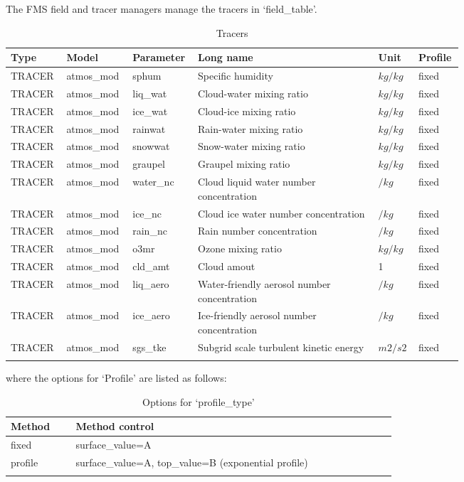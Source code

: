\documentclass[11pt,fleqn]{report}              %
\begin{document}
The FMS field and tracer managers manage the tracers in `field\_table'.
{
\fontsize{9}{11}\selectfont
\begin{longtable}{ p{0.08\linewidth} | p{0.1\linewidth} | p{0.08\linewidth} | p{0.37\linewidth}  | p{0.05\linewidth} | p{0.06\linewidth}}
\hline
\hline
 Type & Model & Parameter & Long name & Unit  & Profile \\
\hline
 TRACER & atmos\_mod & sphum & Specific humidity & $kg/kg$ & fixed \\
 TRACER & atmos\_mod & liq\_wat & Cloud-water mixing ratio & $kg/kg$ & fixed \\
 TRACER & atmos\_mod & ice\_wat & Cloud-ice mixing ratio & $kg/kg$ & fixed \\
 TRACER & atmos\_mod & rainwat & Rain-water mixing ratio & $kg/kg$ & fixed \\
 TRACER & atmos\_mod & snowwat & Snow-water mixing ratio & $kg/kg$ & fixed \\
 TRACER & atmos\_mod & graupel & Graupel mixing ratio & $kg/kg$ & fixed \\
 TRACER & atmos\_mod & water\_nc & Cloud liquid water number concentration & $/kg$ & fixed \\
 TRACER & atmos\_mod & ice\_nc & Cloud ice water number concentration & $/kg$ & fixed \\
 TRACER & atmos\_mod & rain\_nc & Rain number concentration & $/kg$ & fixed \\
 TRACER & atmos\_mod & o3mr & Ozone mixing ratio & $kg/kg$ & fixed \\
 TRACER & atmos\_mod & cld\_amt & Cloud amout & 1 & fixed \\
 TRACER & atmos\_mod & liq\_aero & Water-friendly aerosol number concentration & $/kg$ & fixed \\
 TRACER & atmos\_mod & ice\_aero & Ice-friendly aerosol number concentration & $/kg$ & fixed \\
 TRACER & atmos\_mod & sgs\_tke & Subgrid scale turbulent kinetic energy & $m2/s2$ & fixed \\
\hline
\caption{Tracers}
\label{table:fv3_fld_tracers}
\end{longtable}
}
where the options for `Profile' are listed as follows: 
{
\fontsize{10}{12}\selectfont
\begin{longtable}{p{0.08\linewidth} | p{0.55\linewidth}  }
\hline
\hline
Method & Method control \\
\hline
fixed & surface\_value=A \\
profile & surface\_value=A, top\_value=B (exponential profile) \\
\hline
\caption{Options for `profile\_type'}
\label{table:fv3_fieldtable_profile}
\end{longtable}
}
\end{document}
